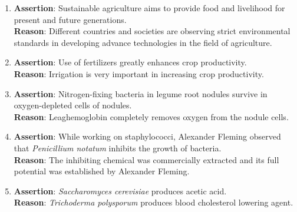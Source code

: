 \documentclass{article}
\begin{document}
\begin{enumerate}
    \item \textbf{Assertion}: Sustainable agriculture aims to provide food and livelihood for present and future generations. \\
    \textbf{Reason}: Different countries and societies are observing strict environmental standards in developing advance technologies in the field of agriculture.

    \item \textbf{Assertion}: Use of fertilizers greatly enhances crop productivity. \\
    \textbf{Reason}: Irrigation is very important in increasing crop productivity.

    \item \textbf{Assertion}: Nitrogen-fixing bacteria in legume root nodules survive in oxygen-depleted cells of nodules. \\
    \textbf{Reason}: Leaghemoglobin completely removes oxygen from the nodule cells.

    \item \textbf{Assertion}: While working on staphylococci, Alexander Fleming observed that \textit{Penicillium notatum} inhibits the growth of bacteria. \\
    \textbf{Reason}: The inhibiting chemical was commercially extracted and its full potential was established by Alexander Fleming.

    \item \textbf{Assertion}: \textit{Saccharomyces cerevisiae} produces acetic acid. \\
    \textbf{Reason}: \textit{Trichoderma polysporum} produces blood cholesterol lowering agent.
\end{enumerate}
\end{document}

